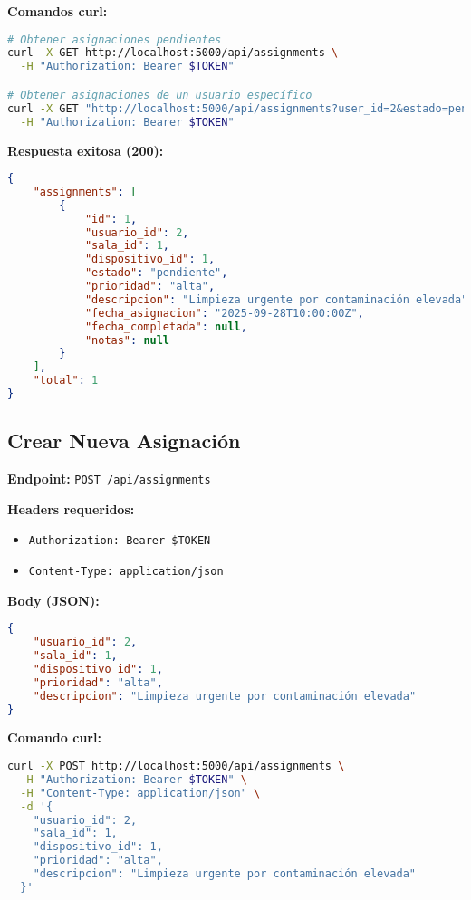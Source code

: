 \documentclass[12pt,a4paper]{article}
\begin{document}
\textbf{Comandos curl:}
\begin{lstlisting}[language=bash]
# Obtener asignaciones pendientes
curl -X GET http://localhost:5000/api/assignments \
  -H "Authorization: Bearer $TOKEN"

# Obtener asignaciones de un usuario específico
curl -X GET "http://localhost:5000/api/assignments?user_id=2&estado=pendiente" \
  -H "Authorization: Bearer $TOKEN"
\end{lstlisting}

\textbf{Respuesta exitosa (200):}
\begin{lstlisting}[language=JSON]
{
    "assignments": [
        {
            "id": 1,
            "usuario_id": 2,
            "sala_id": 1,
            "dispositivo_id": 1,
            "estado": "pendiente",
            "prioridad": "alta",
            "descripcion": "Limpieza urgente por contaminación elevada",
            "fecha_asignacion": "2025-09-28T10:00:00Z",
            "fecha_completada": null,
            "notas": null
        }
    ],
    "total": 1
}
\end{lstlisting}

\subsection{Crear Nueva Asignación}

\textbf{Endpoint:} \texttt{POST /api/assignments}

\textbf{Headers requeridos:}
\begin{itemize}
\item \texttt{Authorization: Bearer \$TOKEN}
\item \texttt{Content-Type: application/json}
\end{itemize}

\textbf{Body (JSON):}
\begin{lstlisting}[language=JSON]
{
    "usuario_id": 2,
    "sala_id": 1,
    "dispositivo_id": 1,
    "prioridad": "alta",
    "descripcion": "Limpieza urgente por contaminación elevada"
}
\end{lstlisting}

\textbf{Comando curl:}
\begin{lstlisting}[language=bash]
curl -X POST http://localhost:5000/api/assignments \
  -H "Authorization: Bearer $TOKEN" \
  -H "Content-Type: application/json" \
  -d '{
    "usuario_id": 2,
    "sala_id": 1,
    "dispositivo_id": 1,
    "prioridad": "alta",
    "descripcion": "Limpieza urgente por contaminación elevada"
  }'
\end{lstlisting}
\end{document}
